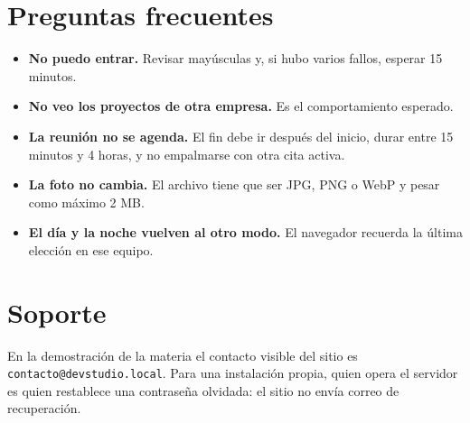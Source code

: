 \section{Preguntas frecuentes}

\begin{itemize}
  \item \textbf{No puedo entrar.} Revisar mayúsculas y, si hubo varios fallos, esperar 15 minutos.
  \item \textbf{No veo los proyectos de otra empresa.} Es el comportamiento esperado.
  \item \textbf{La reunión no se agenda.} El fin debe ir después del inicio, durar entre 15 minutos y 4 horas, y no empalmarse con otra cita activa.
  \item \textbf{La foto no cambia.} El archivo tiene que ser JPG, PNG o WebP y pesar como máximo 2 MB.
  \item \textbf{El día y la noche vuelven al otro modo.} El navegador recuerda la última elección en ese equipo.
\end{itemize}

\section{Soporte}

En la demostración de la materia el contacto visible del sitio es
\texttt{contacto@devstudio.local}. Para una instalación propia, quien opera el
servidor es quien restablece una contraseña olvidada: el sitio no envía correo
de recuperación.


